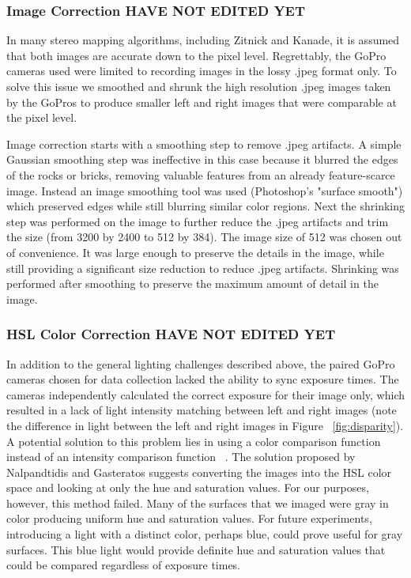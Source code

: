 \documentclass[twocolumn]{article}
\begin{document}
\subsubsection{Image Correction HAVE NOT EDITED YET}
\label{subsec:image_correction}

In many stereo mapping algorithms, including Zitnick and Kanade, it is assumed that both images are accurate down to the pixel level.
Regrettably, the GoPro cameras used were limited to recording images in the lossy .jpeg format only.
To solve this issue we smoothed and shrunk the high resolution .jpeg images taken by the GoPros to produce smaller left and right images that were comparable at the pixel level.

Image correction starts with a smoothing step  to remove .jpeg artifacts.
  A simple Gaussian smoothing step was ineffective in this case because it blurred the edges of the rocks or bricks, removing valuable features from an already feature-scarce image.
  Instead an image smoothing tool was used (Photoshop's "surface smooth") which preserved edges while still blurring similar color regions.
  Next the shrinking step was performed on the image to further reduce the .jpeg artifacts and trim the size (from 3200 by 2400 to 512 by 384).
The image size of 512 was chosen out of convenience.  It was large enough to preserve the details in the image, while still providing a significant size reduction to reduce .jpeg artifacts.   
Shrinking was performed after smoothing to preserve the maximum amount of detail in the image.

\subsubsection{HSL Color Correction HAVE NOT EDITED YET}
\label{subsec:hsl_color_correction}
In addition to the general lighting challenges described above, the paired GoPro cameras chosen for data collection lacked the ability to sync exposure times.
The cameras independently calculated the correct exposure for their image only, which resulted in a lack of light intensity matching between left and right images (note the difference in light between the left and right images in Figure ~\ref{fig:disparity}).
A potential solution to this problem lies in using a color comparison function instead of an intensity comparison function ~\cite{stereo:nalGast}.
The solution proposed by Nalpandtidis and Gasteratos suggests converting the images into the HSL color space and looking at only the hue and saturation values.
For our purposes, however, this method failed.  
Many of the surfaces that we imaged were gray in color producing uniform hue and saturation values.
For future experiments, introducing a light with a distinct color, perhaps blue, could prove useful for gray surfaces.  
This blue light would provide definite hue and saturation values that could be compared regardless of exposure times.
\end{document}
